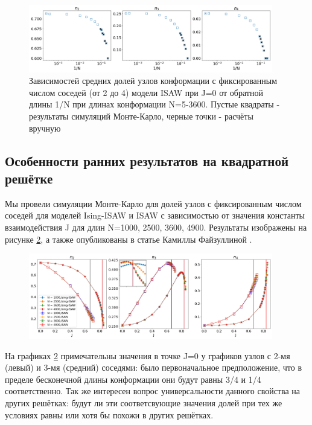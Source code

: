 \begin{figure}[]
    \centering
    \includegraphics[width=0.95\textwidth]{Sections/Images/ISAWJ0_Bulk2-4.png}
    \caption{Зависимостей средних долей узлов конформации с фиксированным числом соседей (от 2 до 4) модели ISAW при J=0 от обратной длины 1/N при длинах конформации N=5-3600. Пустые квадраты - результаты симуляций Монте-Карло, черные точки - расчёты вручную}
    \label{fig:ISAW_Bulk_J0}
\end{figure}

\subsection{Особенности ранних результатов на квадратной решётке}

Мы провели симуляции Монте-Карло для долей узлов с фиксированным числом соседей для моделей Ising-ISAW и ISAW с зависимостью от значения константы взаимодействия J для длин N=1000, 2500, 3600, 4900. Результаты изображены на рисунке \ref{fig:Ising_vs_ISAW__2D_bulk}, а также опубликованы в статье Камиллы Файзуллиной \cite{faizullina2021critical}. 

\begin{figure}[h!]
    \centering
    \includegraphics[width=0.95\textwidth]{Sections/Images/bulk2-4_inset.png}
    \caption{}
    \label{fig:Ising_vs_ISAW__2D_bulk}
\end{figure}

На графиках \ref{fig:Ising_vs_ISAW__2D_bulk} примечательны значения в точке J=0 у графиков узлов с 2-мя (левый) и 3-мя (средний) соседями: было первоначальное предположение, что в пределе бесконечной длины конформации они будут равны 3/4 и 1/4 соответственно. Так же интересен вопрос универсальности данного свойства на других решётках: будут ли эти соответсвующие значения долей при тех же условиях равны или хотя бы похожи в других решётках. 

